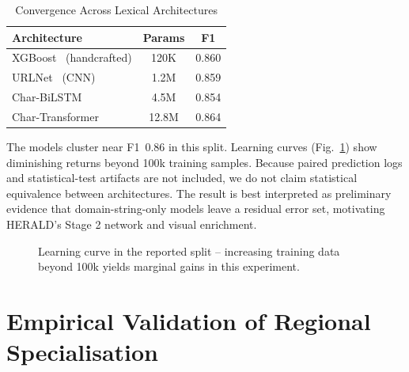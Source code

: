 \documentclass[conference]{IEEEtran}
\begin{document}
\begin{table}[htbp]
\centering
\caption{Convergence Across Lexical Architectures}
\label{tab:architecture_convergence}

\scriptsize
\setlength{\tabcolsep}{4pt}

\begin{tabularx}{\columnwidth}{lcc}
\toprule

\textbf{Architecture} &
\textbf{Params} &
\textbf{F1} \\

\midrule

XGBoost~\cite{xgboost} (handcrafted) & 120K & 0.860 \\
URLNet~\cite{le_urlnet} (CNN) & 1.2M & 0.859 \\
Char-BiLSTM & 4.5M & 0.854 \\
Char-Transformer & 12.8M & 0.864 \\

\bottomrule
\end{tabularx}
\end{table}

The models cluster near F1~0.86 in this split. Learning curves (Fig.~\ref{fig:learning_curve}) show diminishing returns beyond 100k training samples. Because paired prediction logs and statistical-test artifacts are not included, we do not claim statistical equivalence between architectures. The result is best interpreted as preliminary evidence that domain-string-only models leave a residual error set, motivating HERALD's Stage 2 network and visual enrichment.

\begin{figure}[htbp]
\centering
{}
\caption{Learning curve in the reported split -- increasing training data beyond 100k yields marginal gains in this experiment.}
\label{fig:learning_curve}
\end{figure}

\section{Empirical Validation of Regional Specialisation}
\label{sec:regional}
\end{document}
